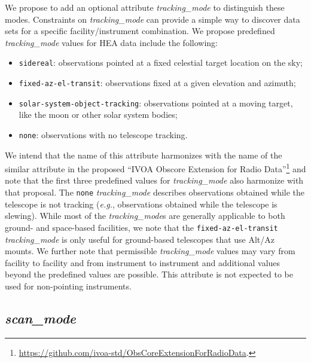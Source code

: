\documentclass[11pt,a4paper]{ivoa}
\begin{document}
We propose to add an optional attribute {\em tracking\_mode\/} to distinguish these modes.  Constraints on {\em tracking\_mode\/} can provide a simple way to discover data sets for a specific facility/instrument combination.  We propose predefined {\em tracking\_mode\/} values for \gls{HEA} data include the following:
\begin{itemize}
	\item \texttt{sidereal}: observations pointed at a fixed celestial target location on the sky;
	\item \texttt{fixed-az-el-transit}: observations fixed at a given elevation and azimuth;
	\item \texttt{solar-system-object-tracking}: observations pointed at a moving target, like the moon or other solar system bodies;
	\item \texttt{none}: observations with no telescope tracking.
\end{itemize}
We intend that the name of this attribute harmonizes with the name of the similar attribute in the proposed ``IVOA Obscore Extension for Radio Data''\footnote{\url{https://github.com/ivoa-std/ObsCoreExtensionForRadioData}.} and note that the first three predefined values for {\em tracking\_mode\/} also harmonize with that proposal.  The \texttt{none} {\em tracking\_mode\/} describes observations obtained while the telescope is not tracking ({\em e.g.\/}, observations obtained while the telescope is slewing). While most of the  {\em tracking\_mode\/}s are generally applicable to both ground- and space-based facilities, we note that the \texttt{fixed-az-el-transit} {\em tracking\_mode\/} is only useful for ground-based telescopes that use Alt/Az mounts.  We further note that permissible {\em tracking\_mode\/} values may vary from facility to facility and from instrument to instrument and additional values beyond the predefined values are possible. This attribute is not expected to be used for non-pointing instruments.

\subsection{{\em scan\_mode}}
\end{document}
